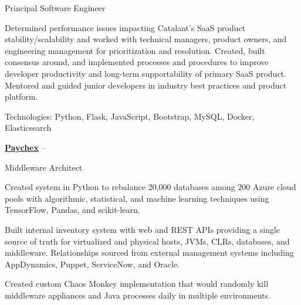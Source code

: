 \documentclass[letterpaper,MMMMyyyy,nonstopmode]{simpleresumecv}
\newif\ifLOCATION
\begin{document}
\begin{Body}
Principal Software Engineer
\ifLOCATION
\hfill
Rochester, New York
\fi

\begin{Detail}
\BulletItem
Determined performance issues impacting Catalant's SaaS product stability/scalability and worked with technical managers, product owners, and engineering management for prioritization and resolution.
\BulletItem
Created, built consensus around, and implemented processes and procedures to improve developer productivity and long-term supportability of primary SaaS product. 
\BulletItem
Mentored and guided junior developers in industry best practices and product platform.

\Gap
Technologies: Python, Flask, JavaScript, Bootstrap, MySQL, Docker, Elasticsearch

\end{Detail}

\BigGap

\Entry
\href{http://www.paychex.com}
{\textbf{Paychex}}
\hfill
{} -- 

Middleware Architect %
\ifLOCATION
\hfill
Rochester, New York
\fi

\begin{Detail}
\iffalse
At Paychex I worked with cross-functional teams to build: an inventory system to track hosts, managed VMs, databases, and middleware appliances; machine learning systems to efficiently repack databases and to predict system utilization based on user metrics; a ground-up implementation of the Netflix Chaos Monkey; implemented AppDynamics on over 20,000 JVMs; and a system to collect and monitor JVM metrics and send alerts via SNMP and SMTP.
\fi

\BulletItem
Created system in Python to rebalance 20,000 databases among 200 Azure cloud pools with algorithmic, statistical, and machine learning techniques using TensorFlow, Pandas, and scikit-learn.

\BulletItem
Built internal inventory system with web and REST APIs providing a single source of truth for virtualized and physical hosts, JVMs, CLRs, databases, and middleware. Relationships sourced from external management systems including AppDynamics, Puppet, ServiceNow, and Oracle.

\BulletItem
Created custom Chaos Monkey implementation that would randomly kill middleware appliances and Java processes daily in multiple environments.


\end{Detail}
\end{Body}
\end{document}
